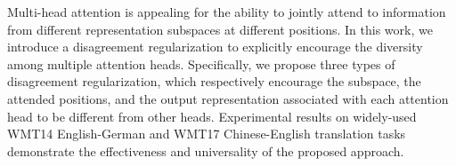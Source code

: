 Multi-head attention is appealing for the ability to jointly attend to information from different representation subspaces at different positions. In this work, we introduce a disagreement regularization to explicitly encourage the diversity among multiple attention heads. Specifically, we propose three types of disagreement regularization, which respectively encourage the subspace, the attended positions, and the output representation associated with each attention head to be different from other heads. Experimental results on widely-used WMT14 English-German and WMT17 Chinese-English translation tasks demonstrate the effectiveness and universality of the proposed approach.

